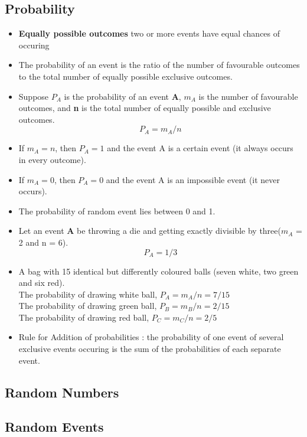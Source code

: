 \documentclass[13pt]{book}
\begin{document}
\subsection{Probability}
\begin{itemize}
  \item \textbf{Equally possible outcomes} two or more events have equal chances of occuring
  \item The probability of an event is the ratio of the number of favourable outcomes to the total number of equally possible exclusive outcomes.
  \item Suppose \textbf{\(P_A\)} is the probability of an event \textbf {A}, \textbf{\(m_A\)} is the number of favourable outcomes, and \textbf{n} is the total number of equally possible and exclusive outcomes. 
    \[P_A = m_A/n\]
  \item If \(m_A=n\), then \(P_A = 1\) and the event A is a certain event (it always occurs in every outcome).
  \item If \(m_A=0\), then \(P_A= 0\) and the event A is an impossible event (it never occurs).
  \item The probability of random event lies between 0 and 1.
  \item Let an event \textbf{A} be throwing a die and getting exactly divisible by three(\(m_A\) = 2 and n = 6).
    \[P_A = 1/3\]
  \item A bag with 15 identical but differently coloured balls (seven white, two green and six red). \\
    The probability of drawing white ball, \( P_A = m_A/n = 7/15\) \\
    The probability of drawing green ball, \( P_B = m_B/n = 2/15\) \\
    The probability of drawing red ball, \( P_C = m_C/n = 2/5\)
  \item Rule for Addition of probabilities : the probability of one event of several exclusive events occuring is the sum of the probabilities of each separate event.

    
\end{itemize}
\subsection{Random Numbers}
\subsection{Random Events}
\end{document}
